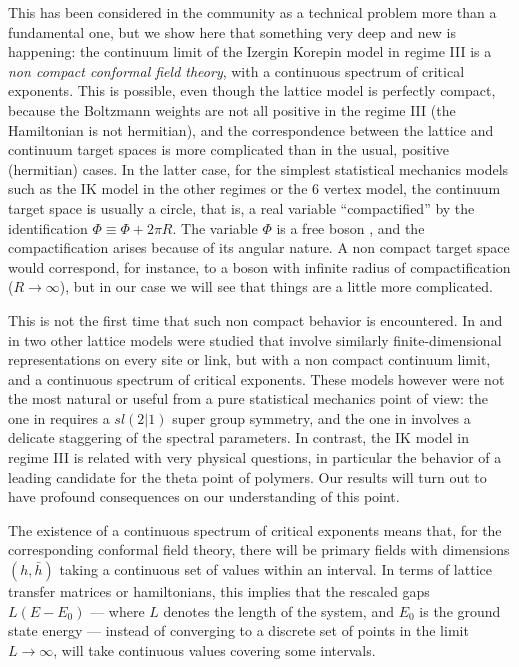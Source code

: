 \documentclass[11pt]{article}
\begin{document}
This has been considered in the community as  a technical problem more than a fundamental one, but we show here that something very deep and new is happening: the continuum limit of the Izergin Korepin model in regime III is a {\sl non compact conformal field theory}, with a continuous spectrum of critical exponents. This is possible, even though the lattice model is perfectly compact, because the Boltzmann weights are not all positive in the regime III (the Hamiltonian is not hermitian), and the correspondence between the lattice and continuum target spaces is more complicated than in the usual, positive (hermitian) cases. In the latter case, for the simplest statistical mechanics models such as the IK model in the other regimes or the 6 vertex model, the continuum target space is usually a circle, that is, a real variable ``compactified''  by the identification $\Phi\equiv \Phi+2\pi R$. The variable $\Phi$ is a free boson \cite{CoulombGasMap}, and the compactification 
arises because of its angular nature. A non compact target space would correspond, for instance, to a boson with infinite radius of compactification ($R\to \infty$), but in our case we will see that things are a little more complicated.

This is not the first time that such non compact behavior is encountered. In \cite{EsslerFS} and in \cite{IkhlefJS1,IkhlefJS2,IkhlefJS3,CanduIkhlef} two other lattice models were studied that involve similarly finite-dimensional representations on every site or link, but with a non compact continuum limit, and a continuous spectrum of critical exponents. These models however were not the most  natural or useful from a pure statistical mechanics point of view: the one in \cite{EsslerFS} requires  a $sl(2|1)$ super group symmetry, and the one in \cite{IkhlefJS1} involves a delicate staggering of the spectral parameters. In contrast, the IK model in regime III is related with very physical questions, in particular the behavior of a leading candidate for the theta point of polymers. Our results will turn out to have profound consequences on our understanding of this point.

The existence of a continuous spectrum of critical exponents means that, for the corresponding conformal field theory, there will be primary fields with dimensions $(h,\bar{h})$ taking a continuous set of values within an interval. In terms of lattice transfer matrices or hamiltonians, this implies that the rescaled gaps $L(E-E_0)$ --- where $L$ denotes the length of the system, and $E_0$ is the ground state energy --- instead of converging to a discrete set of points in the limit $L\to\infty$, will take continuous values covering some intervals.
\end{document}

